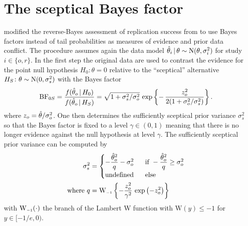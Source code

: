 \documentclass[a4paper, 11pt]{article}
\begin{document}
\section{The sceptical Bayes factor}
\citet{Pawel2022b} modified the reverse-Bayes assessment of replication success
from \citet{Held2020} to use Bayes factors \citep{Jeffreys1961, Kass1995}
instead of tail probabilities as measures of evidence and prior data conflict.
The procedure assumes again the data model
$\hat{\theta}_{i} \,\vert\, \theta \sim \operatorname{N}(\theta, \sigma^{2}_{i})$ for study
$i \in \{o, r\}$. In the first step the original data are used to contrast the
evidence for the point null hypothesis $H_{0} \colon \theta = 0$ relative to the
``sceptical'' alternative $H_{S} \colon \theta \sim \operatorname{N}(0, \sigma^{2}_{s})$
with the Bayes factor
\begin{align*}
  \operatorname{BF}_{0S}
  = \frac{f(\hat{\theta}_{o} \,\vert\, H_{0})}{f(\hat{\theta}_{o} \,\vert\, H_{S})}
  = \sqrt{1 + \sigma^{2}_{s}/\sigma^{2}_{o}} \, \exp\left\{-
  \, \frac{z_{o}^{2}}{2(1 + \sigma^{2}_{o}/\sigma^{2}_{s})}\right\}.
\end{align*}
where $z_{o} = \hat{\theta}/\sigma^{2}_{o}$. One then determines the sufficiently
sceptical prior variance $\sigma^{2}_{s}$ so that the Bayes factor is fixed to a
level $\gamma \in (0, 1)$ meaning that there is no longer evidence against the
null hypothesis at level $\gamma$. The sufficiently sceptical prior variance can
be computed by
\begin{align}
  \label{eq:ssv}
  \sigma^{2}_{s} &=
  \begin{cases}
    -\dfrac{\hat{\theta}_{o}^2}{q} - \sigma^{2}_{o} & ~~ \text{if} ~ -\dfrac{\hat{\theta}_o^2}{q} \geq \sigma^{2}_{o} \\
    \text{undefined} & ~~ \text{else}
  \end{cases} \\
  \text{where} ~ q &= \mathrm{W}_{\scriptscriptstyle{-1}} \left\{-\frac{z_o^2}{\gamma^2} \,
  \exp\left(-z_o^2\right)\right\}
\end{align}
with $\mathrm{W}_{\scriptscriptstyle{-1}}(\cdot)$ the branch of the
Lambert W function with $\text{W}(y) \leq -1$ for $y \in [-1/e, 0)$.
\end{document}
